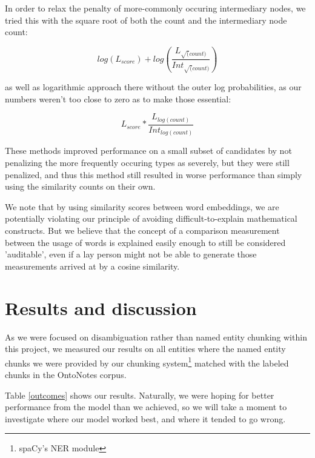 \documentclass[11pt,a4paper]{article}
\begin{document}
In order to relax the penalty of more-commonly occuring intermediary nodes, we tried this with the square root of both the count and the intermediary node count:

$$ log(L_{score}) + log(\frac{L_{\sqrt(count)}}{Int_{\sqrt(count)}}) $$

as well as logarithmic approach there without the outer log probabilities, as our numbers weren't too close to zero as to make those essential:

$$ L_{score} * \frac{L_{log(count)}}{Int_{log(count)}} $$

These methods improved performance on a small subset of candidates by not penalizing the more frequently occuring types as severely, but they were still penalized, and thus this method still resulted in worse performance than simply using the similarity counts on their own.

We note that by using similarity scores between word embeddings, we are potentially violating our principle of avoiding difficult-to-explain mathematical constructs. But we believe that the concept of a comparison measurement between the usage of words is explained easily enough to still be considered 'auditable', even if a lay person might not be able to generate those measurements arrived at by a cosine similarity.

\section{Results and discussion}

As we were focused on disambiguation rather than named entity chunking within this project, we measured our results on all entities where the named entity chunks we were provided by our chunking system\footnote{spaCy's NER module} matched with the labeled chunks in the OntoNotes corpus.

Table \ref{outcomes} shows our results. Naturally, we were hoping for better performance from the model than we achieved, so we will take a moment to investigate where our model worked best, and where it tended to go wrong.
\end{document}
